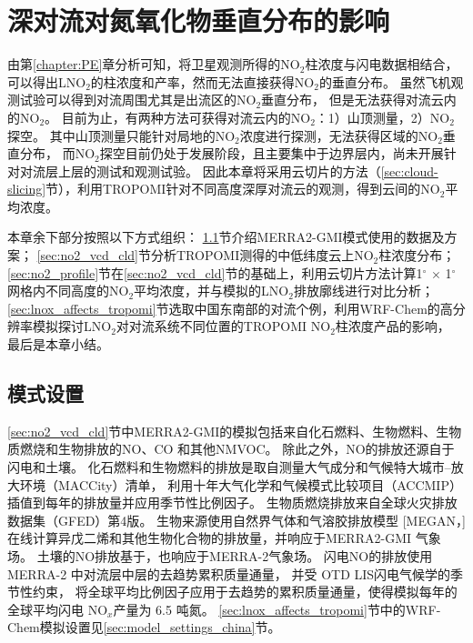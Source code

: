
\chapter{深对流对氮氧化物垂直分布的影响} \label{sec:effects_on_nox_profile}

由第\ref{chapter:PE}章分析可知，将卫星观测所得的NO$_2$柱浓度与闪电数据相结合，
可以得出LNO$_2$的柱浓度和产率，然而无法直接获得NO$_2$的垂直分布。
虽然飞机观测试验可以得到对流周围尤其是出流区的NO$_2$垂直分布\citep{Barth.2019}，
但是无法获得对流云内的NO$_2$。
目前为止，有两种方法可获得对流云内的NO$_2$：1）山顶测量，2）NO$_2$探空。
其中山顶测量只能针对局地的NO$_2$浓度进行探测，无法获得区域的NO$_2$垂直分布\citep{Reiter.1970,Wang.2021a}，
而NO$_2$探空目前仍处于发展阶段，且主要集中于边界层内\citep{Sluis.2010}，尚未开展针对对流层上层的测试和观测试验。
因此本章将采用云切片的方法（\ref{sec:cloud-slicing}节），利用TROPOMI针对不同高度深厚对流云的观测，得到云间的NO$_2$平均浓度。

本章余下部分按照以下方式组织：
\ref{sec:model_settings_gmi}节介绍MERRA2-GMI模式使用的数据及方案；
\ref{sec:no2_vcd_cld}节分析TROPOMI测得的中低纬度云上NO$_2$柱浓度分布；
\ref{sec:no2_profile}节在\ref{sec:no2_vcd_cld}节的基础上，利用云切片方法计算1$^{\circ}$ $\times$ 1$^{\circ}$ 网格内不同高度的NO$_2$平均浓度，并与模拟的LNO$_2$排放廓线进行对比分析；
\ref{sec:lnox_affects_tropomi}节选取中国东南部的对流个例，利用WRF-Chem的高分辨率模拟探讨LNO$_2$对对流系统不同位置的TROPOMI NO$_2$柱浓度产品的影响，
最后是本章小结。



\section{模式设置} \label{sec:model_settings_gmi}

\ref{sec:no2_vcd_cld}节中MERRA2-GMI的模拟包括来自化石燃料、生物燃料、生物质燃烧和生物排放的NO、CO 和其他NMVOC。
除此之外，NO的排放还源自于闪电和土壤。
化石燃料和生物燃料的排放是取自测量大气成分和气候特大城市--放大环境（MACCity）清单\citep{Granier.2011}，
利用十年大气化学和气候模式比较项目（ACCMIP）插值到每年的排放量并应用季节性比例因子\citep{Lamarque.2010}。
生物质燃烧排放来自全球火灾排放数据集（GFED）第4版\citep{Giglio.2013}。
生物来源使用自然界气体和气溶胶排放模型 [MEGAN，\citet{Guenther.1999}]
在线计算异戊二烯和其他生物化合物的排放量，并响应于MERRA2-GMI 气象场。
土壤的NO排放基于\citet{Yienger.1995}，也响应于MERRA-2气象场。
闪电NO的排放使用 MERRA-2 中对流层中层的去趋势累积质量通量\citep{Allen.2010}，
并受 OTD LIS闪电气候学的季节性约束\citep{Cecil.2014}，
将全球平均比例因子应用于去趋势的累积质量通量，使得模拟每年的全球平均闪电 NO$_x$产量为 6.5 吨氮。
\ref{sec:lnox_affects_tropomi}节中的WRF-Chem模拟设置见\ref{sec:model_settings_china}节。


